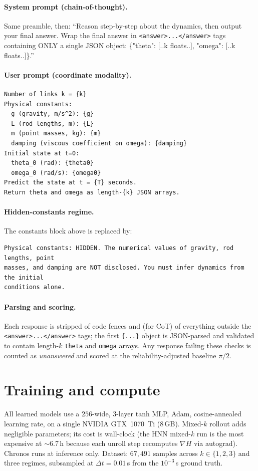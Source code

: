 \documentclass{article}
\begin{document}
\paragraph{System prompt (chain-of-thought).} Same preamble, then: ``Reason
step-by-step about the dynamics, then output your final answer. Wrap the final answer
in \texttt{<answer>...</answer>} tags containing ONLY a single JSON object:
\{"theta": [..k floats..], "omega": [..k floats..]\}.''

\paragraph{User prompt (coordinate modality).}
\begin{small}\begin{verbatim}
Number of links k = {k}
Physical constants:
  g (gravity, m/s^2): {g}
  L (rod lengths, m): {L}
  m (point masses, kg): {m}
  damping (viscous coefficient on omega): {damping}
Initial state at t=0:
  theta_0 (rad): {theta0}
  omega_0 (rad/s): {omega0}
Predict the state at t = {T} seconds.
Return theta and omega as length-{k} JSON arrays.
\end{verbatim}\end{small}

\paragraph{Hidden-constants regime.} The constants block above is replaced by:
\begin{small}\begin{verbatim}
Physical constants: HIDDEN. The numerical values of gravity, rod lengths, point
masses, and damping are NOT disclosed. You must infer dynamics from the initial
conditions alone.
\end{verbatim}\end{small}

\paragraph{Parsing and scoring.} Each response is stripped of code fences and (for
CoT) of everything outside the \texttt{<answer>...</answer>} tags; the first
\texttt{\{...\}} object is JSON-parsed and validated to contain length-$k$
\texttt{theta} and \texttt{omega} arrays. Any response failing these checks is counted
as \emph{unanswered} and scored at the reliability-adjusted baseline $\pi/2$.

\section{Training and compute}
All learned models use a $256$-wide, $3$-layer tanh MLP, Adam, cosine-annealed
learning rate, on a single NVIDIA GTX~1070~Ti (8\,GB). Mixed-$k$ rollout adds
negligible parameters; its cost is wall-clock (the HNN mixed-$k$ run is the most
expensive at $\sim$6.7\,h because each unroll step recomputes $\nabla H$ via
autograd). Chronos runs at inference only. Dataset: $67{,}491$ samples across
$k\in\{1,2,3\}$ and three regimes, subsampled at $\Delta t{=}0.01$\,s from the
$10^{-3}$\,s ground truth.
\end{document}
